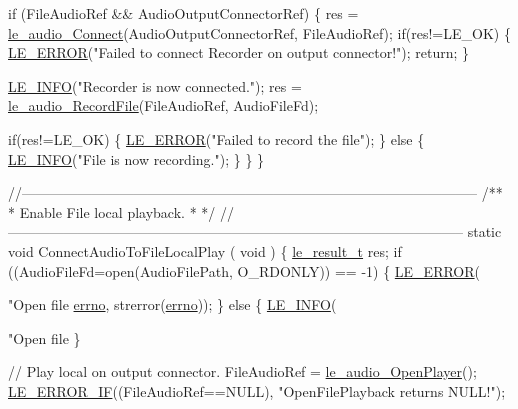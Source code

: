 \begin{DoxyCodeInclude}
{{{{{    \textcolor{keywordflow}{if} (FileAudioRef && AudioOutputConnectorRef)
    \{
        res = \hyperlink{le__audio__interface_8h_a338df65b2fb1ae0140d86880adbcf0de}{le\_audio\_Connect}(AudioOutputConnectorRef, FileAudioRef);
        \textcolor{keywordflow}{if}(res!=LE\_OK)
        \{
            \hyperlink{le__log_8h_a353590f91b3143a7ba3a416ae5a50c3d}{LE\_ERROR}(\textcolor{stringliteral}{"Failed to connect Recorder on output connector!"});
            \textcolor{keywordflow}{return};
        \}

        \hyperlink{le__log_8h_a23e6d206faa64f612045d688cdde5808}{LE\_INFO}(\textcolor{stringliteral}{"Recorder is now connected."});
        res = \hyperlink{le__audio__interface_8h_a393a26f6cff7fe05c1813fcafeef50f3}{le\_audio\_RecordFile}(FileAudioRef, AudioFileFd);

        \textcolor{keywordflow}{if}(res!=LE\_OK)
        \{
            \hyperlink{le__log_8h_a353590f91b3143a7ba3a416ae5a50c3d}{LE\_ERROR}(\textcolor{stringliteral}{"Failed to record the file"});
        \}
        \textcolor{keywordflow}{else}
        \{
            \hyperlink{le__log_8h_a23e6d206faa64f612045d688cdde5808}{LE\_INFO}(\textcolor{stringliteral}{"File is now recording."});
        \}
    \}
\}

\textcolor{comment}{//--------------------------------------------------------------------------------------------------}\textcolor{comment}{}
\textcolor{comment}{/**}
\textcolor{comment}{ * Enable File local playback.}
\textcolor{comment}{ *}
\textcolor{comment}{ */}
\textcolor{comment}{//--------------------------------------------------------------------------------------------------}
\textcolor{keyword}{static} \textcolor{keywordtype}{void} ConnectAudioToFileLocalPlay
(
    \textcolor{keywordtype}{void}
)
\{
    \hyperlink{le__basics_8h_a1cca095ed6ebab24b57a636382a6c86c}{le\_result\_t} res;
    \textcolor{keywordflow}{if} ((AudioFileFd=open(AudioFilePath, O\_RDONLY)) == -1)
    \{
        \hyperlink{le__log_8h_a353590f91b3143a7ba3a416ae5a50c3d}{LE\_ERROR}(\textcolor{stringliteral}{"Open file %
      \hyperlink{supervisor_8c_a0a4ccfdbe1cf7b37afc60d34e748b066}{errno}, strerror(\hyperlink{supervisor_8c_a0a4ccfdbe1cf7b37afc60d34e748b066}{errno}));
    \}
    \textcolor{keywordflow}{else}
    \{
        \hyperlink{le__log_8h_a23e6d206faa64f612045d688cdde5808}{LE\_INFO}(\textcolor{stringliteral}{"Open file %
    \}

    \textcolor{comment}{// Play local on output connector.}
    FileAudioRef = \hyperlink{le__audio__interface_8h_a92eb1b6377f50ff07b97c5b8546f01ec}{le\_audio\_OpenPlayer}();
    \hyperlink{le__log_8h_aceaf11a11691d6c676e36dd317b38dbd}{LE\_ERROR\_IF}((FileAudioRef==NULL), \textcolor{stringliteral}{"OpenFilePlayback returns NULL!"});

}}}}}}}
\end{DoxyCodeInclude}
